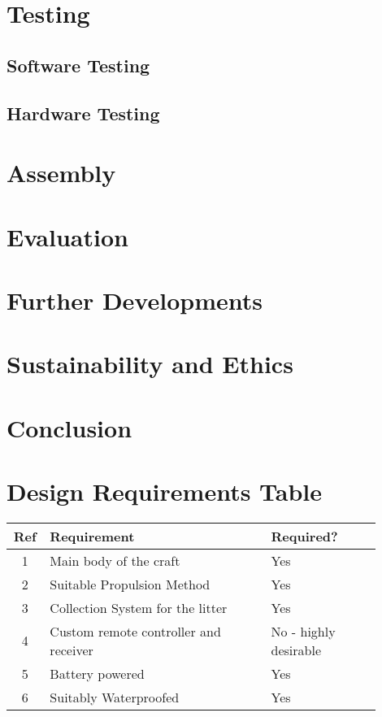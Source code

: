 \documentclass [11pt]{article}
\begin{document}
\section{Testing}
\subsection{Software Testing}
\subsection{Hardware Testing}

\section{Assembly}
\section{Evaluation}
\section{Further Developments}
\section{Sustainability and Ethics}
\section{Conclusion}

\newpage




\newpage
\appendix

\section{Design Requirements Table}\label{app:design_requirements_hardware}

\begin{table}[H]
\begin{tabular}{||c||p{0.6\linewidth}|p{0.3\linewidth}||}
\hline
Ref & Requirement                           & Required?             \\
\hline
1   & Main body of the craft                & Yes                   \\
\hline
2   & Suitable Propulsion Method            & Yes                   \\
\hline
3   & Collection System for the litter      & Yes                   \\
\hline
4   & Custom remote controller and receiver & No - highly desirable \\
\hline
5   & Battery powered                       & Yes                   \\
\hline
6   & Suitably Waterproofed                 & Yes\\
\hline              
\end{tabular}
\end{table}
\end{document}
